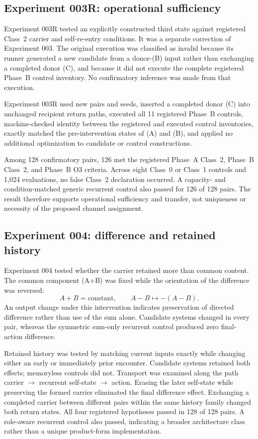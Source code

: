 \documentclass[11pt,a4paper]{article}
\begin{document}
\subsection{Experiment 003R: operational sufficiency}

Experiment 003R tested an explicitly constructed third state against registered Class~2 carrier and self-re-entry conditions. It was a separate correction of Experiment 003. The original execution was classified as invalid because its runner generated a new candidate from a donor-(B) input rather than exchanging a completed donor (C), and because it did not execute the complete registered Phase~B control inventory. No confirmatory inference was made from that execution.

Experiment 003R used new pairs and seeds, inserted a completed donor (C) into unchanged recipient return paths, executed all 11 registered Phase~B controls, machine-checked identity between the registered and executed control inventories, exactly matched the pre-intervention states of (A) and (B), and applied no additional optimization to candidate or control constructions.

Among 128 confirmatory pairs, 126 met the registered Phase~A Class~2, Phase~B Class~2, and Phase~B O3 criteria. Across eight Class~0 or Class~1 controls and 1,024 evaluations, no false Class~2 declaration occurred. A capacity- and condition-matched generic recurrent control also passed for 126 of 128 pairs. The result therefore supports operational sufficiency and transfer, not uniqueness or necessity of the proposed channel assignment.

\subsection{Experiment 004: difference and retained history}

Experiment 004 tested whether the carrier retained more than common content. The common component (A+B) was fixed while the orientation of the difference was reversed:
\begin{equation}
  A+B=\text{constant}, \qquad A-B \mapsto -(A-B).
\end{equation}
An output change under this intervention indicates preservation of directed difference rather than use of the sum alone. Candidate systems changed in every pair, whereas the symmetric sum-only recurrent control produced zero final-action difference.

Retained history was tested by matching current inputs exactly while changing either an early or immediately prior encounter. Candidate systems retained both effects; memoryless controls did not. Transport was examined along the path carrier \(\rightarrow\) recurrent self-state \(\rightarrow\) action. Erasing the later self-state while preserving the formed carrier eliminated the final difference effect. Exchanging a completed carrier between different pairs within the same history family changed both return states. All four registered hypotheses passed in 128 of 128 pairs. A role-aware recurrent control also passed, indicating a broader architecture class rather than a unique product-form implementation.
\end{document}
